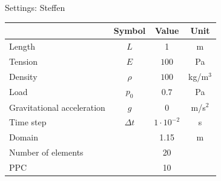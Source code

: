 \documentclass[mathserif,professionalfont]{beamer}
\begin{document}
\begin{frame}{Settings: Steffen}
\begin{table}[h]
\centering
\begin{tabular}{l | c c c}
 & Symbol & Value & Unit \\
\hline
Length& $L$ & 1 & m\\
Tension& $E$ & $ 100$ & Pa\\
Density & $\rho$ & $100$ & kg/m$^3$\\
Load & $p_0$ & $0.7$ & Pa\\
Gravitational acceleration & $g$ & 0  & m/s$^2$\\ 
Time step & $\Delta t$ &$ 1 \cdot10^{-2}$ & s\\
Domain & & 1.15 & m \\
Number of elements & & 20& \\
PPC & & 10 & \\
\end{tabular}
\end{table}
\end{frame}
\end{document}
